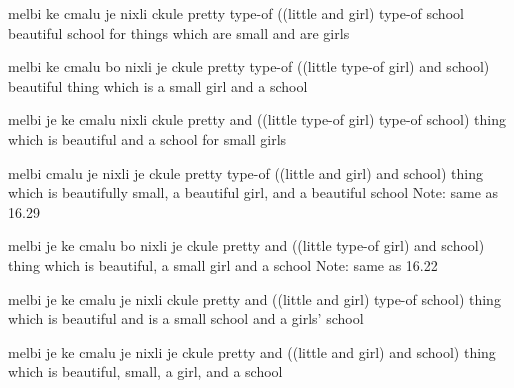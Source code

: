 \begin{example}
melbi ke cmalu je nixli ckule \n
pretty type-of ((little and girl) type-of school\n
beautiful school for things which are small\n
\T	and are girls
\end{example}

\begin{example}
melbi ke cmalu bo nixli je ckule \n
pretty type-of ((little type-of girl) and school)\n
beautiful thing which is a small girl and a school
\end{example}

\begin{example}
melbi je ke cmalu nixli ckule \n
pretty and ((little type-of girl) type-of school)\n
thing which is beautiful and a school for small girls
\end{example}

\begin{example}
melbi cmalu je nixli je ckule\n
pretty type-of ((little and girl) and school)\n
thing which is beautifully small, a beautiful girl,\n
\T	and a beautiful school\n
Note: same as 16.29
\end{example}

\begin{example}
melbi je ke cmalu bo nixli je ckule \n
pretty and ((little type-of girl) and school)\n
thing which is beautiful, a small girl and a school\n
Note: same as 16.22
\end{example}

\begin{example}
melbi je ke cmalu je nixli ckule \n
pretty and ((little and girl) type-of school)\n
thing which is beautiful and is a small school\n
\T	and a girls' school
\end{example}

\begin{example}
melbi je ke cmalu je nixli je ckule \n
pretty and ((little and girl) and school)\n
thing which is beautiful, small, a girl, and a school
\end{example}
